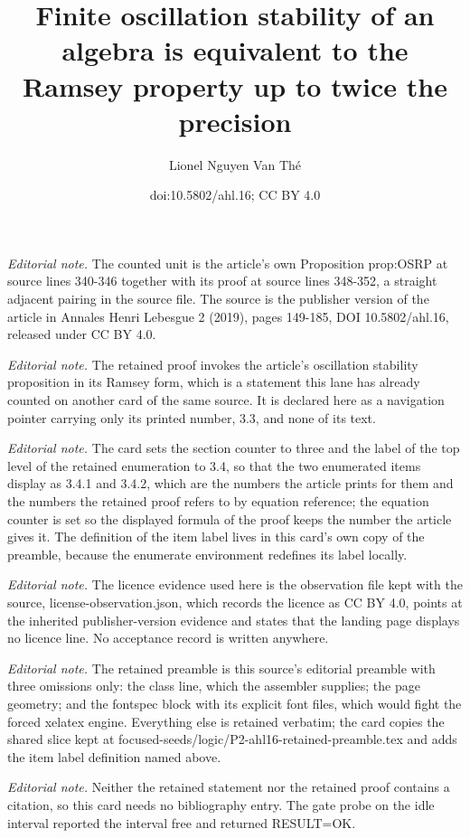 \documentclass[10pt,a4paper]{article}
\title{Finite oscillation stability of an algebra is equivalent to the Ramsey property up to twice the precision}
\author{Lionel Nguyen Van Thé}
\date{doi:10.5802/ahl.16; CC BY 4.0}
\theoremstyle{definition}
\numberwithin{equation}{section}
\numberwithin{figure}{section}
\numberwithin{table}{section}
\begin{document}
\maketitle
\setcounter{section}{3}
\setcounter{enumi}{3}
\setcounter{equation}{1}
\noindent\textit{Editorial note.} The counted unit is the article's own Proposition prop:OSRP at source lines 340-346 together with its proof at source lines 348-352, a straight adjacent pairing in the source file. The source is the publisher version of the article in Annales Henri Lebesgue 2 (2019), pages 149-185, DOI 10.5802/ahl.16, released under CC BY 4.0.\par\medskip
\noindent\textit{Editorial note.} The retained proof invokes the article's oscillation stability proposition in its Ramsey form, which is a statement this lane has already counted on another card of the same source. It is declared here as a navigation pointer carrying only its printed number, 3.3, and none of its text.\par\medskip
\noindent\textit{Editorial note.} The card sets the section counter to three and the label of the top level of the retained enumeration to 3.4, so that the two enumerated items display as 3.4.1 and 3.4.2, which are the numbers the article prints for them and the numbers the retained proof refers to by equation reference; the equation counter is set so the displayed formula of the proof keeps the number the article gives it. The definition of the item label lives in this card's own copy of the preamble, because the enumerate environment redefines its label locally.\par\medskip
\noindent\textit{Editorial note.} The licence evidence used here is the observation file kept with the source, license-observation.json, which records the licence as CC BY 4.0, points at the inherited publisher-version evidence and states that the landing page displays no licence line. No acceptance record is written anywhere.\par\medskip
\noindent\textit{Editorial note.} The retained preamble is this source's editorial preamble with three omissions only: the class line, which the assembler supplies; the page geometry; and the fontspec block with its explicit font files, which would fight the forced xelatex engine. Everything else is retained verbatim; the card copies the shared slice kept at focused-seeds/logic/P2-ahl16-retained-preamble.tex and adds the item label definition named above.\par\medskip
\noindent\textit{Editorial note.} Neither the retained statement nor the retained proof contains a citation, so this card needs no bibliography entry. The gate probe on the idle interval reported the interval free and returned RESULT=OK.\par\medskip
\end{document}
